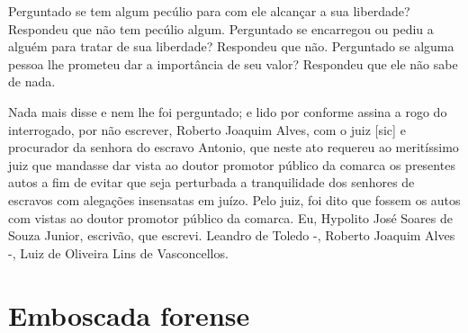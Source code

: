 {Perguntado se tem algum pecúlio para com ele alcançar a sua liberdade?
Respondeu que não tem pecúlio algum. Perguntado se encarregou ou pediu a
alguém para tratar de sua liberdade? Respondeu que não. Perguntado se
alguma pessoa lhe prometeu dar a importância de seu valor? Respondeu que
ele não sabe de nada.

Nada mais disse e nem lhe foi perguntado; e lido por conforme assina a
rogo do interrogado, por não escrever, Roberto Joaquim Alves, com o juiz
{[}sic{]} e procurador da senhora do escravo Antonio, que neste ato
requereu ao meritíssimo juiz que mandasse dar vista ao doutor promotor
público da comarca os presentes autos a fim de evitar que seja
perturbada a tranquilidade dos senhores de escravos com alegações
insensatas em juízo. Pelo juiz, foi dito que fossem os autos com vistas
ao doutor promotor público da comarca. Eu, Hypolito José Soares de Souza
Junior, escrivão, que escrevi. Leandro de Toledo -, Roberto Joaquim
Alves -, Luiz de Oliveira Lins de Vasconcellos.

\part{Emboscada forense}

}
